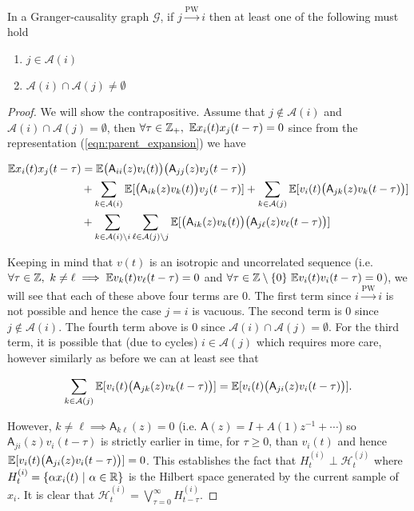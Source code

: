 \documentclass[12pt]{article}
\def\pwgc{\overset{\text{PW}}{\rightarrow}}  %
\def\gcg{\mathcal{G}}  %
\def\A{\mathsf{A}}  %
\def\H{\mathcal{H}}  %
\newcommand{\anc}[1]{\mathcal{A}(#1)}  %
\begin{document}
\begin{proposition}
  \label{prop:ancestor_properties}
  In a Granger-causality graph $\gcg$, if $j \pwgc i$ then at least
  one of the following must hold

  \begin{enumerate}
    \item{$j \in \anc{i}$}
    \item{$\anc{i} \cap \anc{j} \ne \emptyset$}
  \end{enumerate}
\end{proposition}
\begin{proof}
  We will show the contrapositive.  Assume that $j \not \in \anc{i}$ and $\anc{i} \cap \anc{j} = \emptyset$, then $\forall \tau \in \mathbb{Z}_+,\ \mathbb{E} x_i(t)x_j(t - \tau) = 0$ since from the representation (\ref{eqn:parent_expansion}) we have

  \begin{align*}
    \E x_i(t)x_j(t - \tau) &= \E \big(\A_{ii}(z)v_i(t)\big)\big(\A_{jj}(z)v_j(t - \tau)\big)\\
    &+ \sum_{k \in \anc{i}}\E[\big(\A_{ik}(z)v_k(t)\big)v_j(t - \tau)] + \sum_{k \in \anc{j}}\E[v_i(t) \big(\A_{jk}(z) v_k(t - \tau)\big)]\\
    &+ \sum_{k \in \anc{i} \setminus i}\sum_{\ell \in \anc{j} \setminus j}\E[\big(\A_{ik}(z)v_k(t)\big)\big(\A_{j\ell}(z)v_\ell(t - \tau)\big)]\\
  \end{align*}

  Keeping in mind that $v(t)$ is an isotropic and uncorrelated sequence (i.e. $\forall \tau \in \mathbb{Z},\ k \ne \ell \implies \mathbb{E} v_k(t)v_\ell(t - \tau) = 0$ and $\forall \tau \in \mathbb{Z}\setminus\{0\}\ \mathbb{E} v_i(t)v_i(t - \tau) = 0$), we will see that each of these above four terms are 0.  The first term since $i \pwgc i$ is not possible and hence the case $j = i$ is vacuous.  The second term is 0 since $j \not\in \anc{i}$.  The fourth term above is 0 since $\anc{i} \cap \anc{j} = \emptyset$.  For the third term, it is possible that (due to cycles) $i \in \anc{j}$ which requires more care, however similarly as before we can at least see that

  \begin{equation*}
    \sum_{k \in \anc{j}}\E[v_i(t) \big(\A_{jk}(z) v_k(t - \tau)\big)] = \E[v_i(t)\big(\A_{ji}(z)v_i(t - \tau)\big)].
  \end{equation*}

  However, $k \ne \ell \implies \A_{k\ell}(z) = 0$ (i.e. $\A(z) = I + A(1)z^{-1} + \cdots$) so $\A_{ji}(z)v_i(t - \tau)$ is strictly earlier in time, for $\tau \ge 0$, than $v_i(t)$ and hence $\E[v_i(t)\big(\A_{ji}(z)v_i(t - \tau)\big)] = 0$.  This establishes the fact that $H_t^{(i)} \perp \H_t^{(j)}$ where $H_t^{(i)} = \{\alpha x_i(t)\ |\ \alpha \in \mathbb{R}\}$ is the Hilbert space generated by the current sample of $x_i$.  It is clear that $\H_t^{(i)} = \bigvee_{\tau = 0}^\infty H_{t - \tau}^{(i)}$.


\end{proof}
\end{document}

